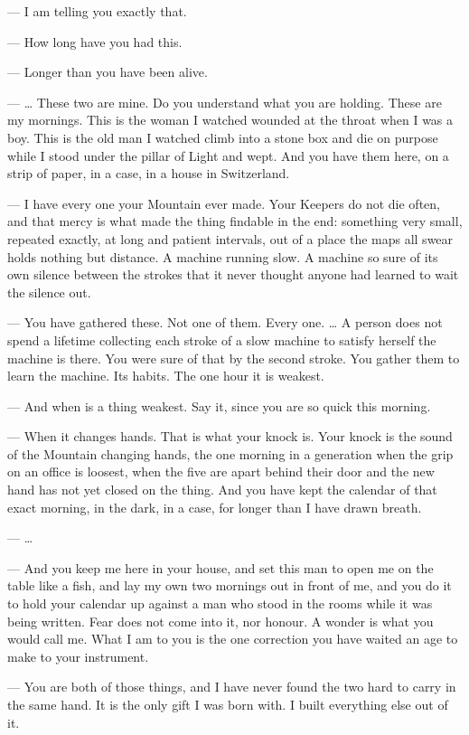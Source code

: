 \begin{room}
--- I am telling you exactly that.

--- How long have you had this.

--- Longer than you have been alive.

--- \ldots{} These two are mine. Do you understand what you are holding. These are my mornings. This is the woman I watched wounded at the throat when I was a boy. This is the old man I watched climb into a stone box and die on purpose while I stood under the pillar of Light and wept. And you have them here, on a strip of paper, in a case, in a house in Switzerland.

--- I have every one your Mountain ever made. Your Keepers do not die often, and that mercy is what made the thing findable in the end: something very small, repeated exactly, at long and patient intervals, out of a place the maps all swear holds nothing but distance. A machine running slow. A machine so sure of its own silence between the strokes that it never thought anyone had learned to wait the silence out.

--- You have gathered these. Not one of them. Every one. \ldots{} A person does not spend a lifetime collecting each stroke of a slow machine to satisfy herself the machine is there. You were sure of that by the second stroke. You gather them to learn the machine. Its habits. The one hour it is weakest.

--- And when is a thing weakest. Say it, since you are so quick this morning.

--- When it changes hands. That is what your knock is. Your knock is the sound of the Mountain changing hands, the one morning in a generation when the grip on an office is loosest, when the five are apart behind their door and the new hand has not yet closed on the thing. And you have kept the calendar of that exact morning, in the dark, in a case, for longer than I have drawn breath.

--- \ldots{}

--- And you keep me here in your house, and set this man to open me on the table like a fish, and lay my own two mornings out in front of me, and you do it to hold your calendar up against a man who stood in the rooms while it was being written. Fear does not come into it, nor honour. A wonder is what you would call me. What I am to you is the one correction you have waited an age to make to your instrument.

--- You are both of those things, and I have never found the two hard to carry in the same hand. It is the only gift I was born with. I built everything else out of it.


\end{room}
